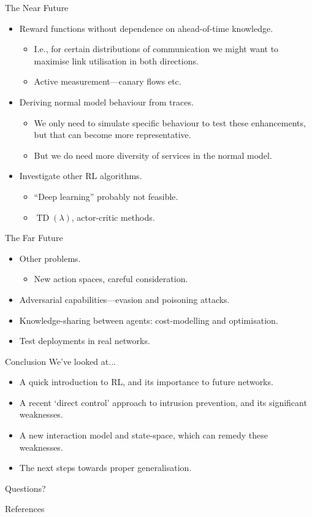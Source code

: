 \documentclass[aspectratio=169,xcolor={dvipsnames}
,hide notes
]{beamer}
\begin{document}
\begin{frame}{The Near Future}
\begin{itemize}
	\item Reward functions without dependence on ahead-of-time knowledge.
	\begin{itemize}
		\item I.e., for certain distributions of communication we might want to maximise link utilisation in both directions.
		\item Active measurement---canary flows etc.
	\end{itemize}

\item Deriving normal model behaviour from traces.
\begin{itemize}
	\item We only need to simulate specific behaviour to test these enhancements, but that can become more representative.
	\item But we do need more diversity of services in the normal model.
\end{itemize}

\item Investigate other RL algorithms.
\begin{itemize}
	\item ``Deep learning'' probably not feasible.
	\item \alert{$\operatorname{TD}(\lambda)$, actor-critic methods}.
\end{itemize}
\end{itemize}
\end{frame}

\begin{frame}{The Far Future}
\begin{itemize}
	\item Other problems.
	\begin{itemize}
		\item New action spaces, careful consideration.
	\end{itemize}
\item Adversarial capabilities---evasion and poisoning attacks.
\item Knowledge-sharing between agents: cost-modelling and optimisation.
\item Test deployments in real networks.
\end{itemize}
\end{frame}

\begin{frame}[standout]{Conclusion}
	We've looked at...
	\begin{itemize}
		\item A quick introduction to RL, and its \alert{importance to future networks}.
		\item A recent `direct control' approach to intrusion prevention, and \alert{its significant weaknesses}.
		\item A \alert{new interaction model and state-space}, which can remedy these weaknesses.
		\item The \alert{next steps} towards proper generalisation.
	\end{itemize}
	
	\alert{Questions?}
\end{frame}

\appendix

\begin{frame}[allowframebreaks]{References}
\printbibliography[heading=none]
\end{frame}
\end{document}
